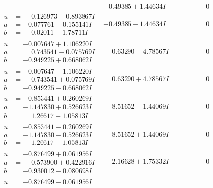 \documentclass[1p]{elsarticle_modified}
\theoremstyle{definition}
\begin{document}
$$\begin{array}{c|c|c}
 & -0.49385 + 1.44634 I & \phantom{-0.000000 } 0 \\ \hline\begin{aligned}
u &= \phantom{-}0.126973 - 0.893867 I \\
a &= -0.077761 - 0.155141 I \\
b &= \phantom{-}0.02011 + 1.78711 I\end{aligned}
 & -0.49385 - 1.44634 I & \phantom{-0.000000 } 0 \\ \hline\begin{aligned}
u &= -0.007647 + 1.106220 I \\
a &= \phantom{-}0.743541 - 0.075769 I \\
b &= -0.949225 + 0.668062 I\end{aligned}
 & \phantom{-}0.63290 - 4.78567 I & \phantom{-0.000000 } 0 \\ \hline\begin{aligned}
u &= -0.007647 - 1.106220 I \\
a &= \phantom{-}0.743541 + 0.075769 I \\
b &= -0.949225 - 0.668062 I\end{aligned}
 & \phantom{-}0.63290 + 4.78567 I & \phantom{-0.000000 } 0 \\ \hline\begin{aligned}
u &= -0.853441 + 0.260269 I \\
a &= -1.147830 + 0.526623 I \\
b &= \phantom{-}1.26617 - 1.05813 I\end{aligned}
 & \phantom{-}8.51652 - 1.44069 I & \phantom{-0.000000 } 0 \\ \hline\begin{aligned}
u &= -0.853441 - 0.260269 I \\
a &= -1.147830 - 0.526623 I \\
b &= \phantom{-}1.26617 + 1.05813 I\end{aligned}
 & \phantom{-}8.51652 + 1.44069 I & \phantom{-0.000000 } 0 \\ \hline\begin{aligned}
u &= -0.876499 + 0.061956 I \\
a &= \phantom{-}0.573900 + 0.422916 I \\
b &= -0.930012 - 0.080698 I\end{aligned}
 & \phantom{-}2.16628 + 1.75332 I & \phantom{-0.000000 } 0 \\ \hline\begin{aligned}
u &= -0.876499 - 0.061956 I \\

\end{aligned}
\end{array}$$
\end{document}
